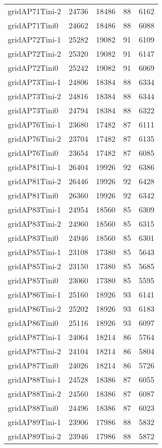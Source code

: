 \begin{longtable}{lrrrr}
gridAP71Tini-2 & 24736 & 18486 & 88 & 6162 \\
gridAP71Tini0 & 24662 & 18486 & 88 & 6088 \\
gridAP72Tini-1 & 25282 & 19082 & 91 & 6109 \\
gridAP72Tini-2 & 25320 & 19082 & 91 & 6147 \\
gridAP72Tini0 & 25242 & 19082 & 91 & 6069 \\
gridAP73Tini-1 & 24806 & 18384 & 88 & 6334 \\
gridAP73Tini-2 & 24816 & 18384 & 88 & 6344 \\
gridAP73Tini0 & 24794 & 18384 & 88 & 6322 \\
gridAP76Tini-1 & 23680 & 17482 & 87 & 6111 \\
gridAP76Tini-2 & 23704 & 17482 & 87 & 6135 \\
gridAP76Tini0 & 23654 & 17482 & 87 & 6085 \\
gridAP81Tini-1 & 26404 & 19926 & 92 & 6386 \\
gridAP81Tini-2 & 26446 & 19926 & 92 & 6428 \\
gridAP81Tini0 & 26360 & 19926 & 92 & 6342 \\
gridAP83Tini-1 & 24954 & 18560 & 85 & 6309 \\
gridAP83Tini-2 & 24960 & 18560 & 85 & 6315 \\
gridAP83Tini0 & 24946 & 18560 & 85 & 6301 \\
gridAP85Tini-1 & 23108 & 17380 & 85 & 5643 \\
gridAP85Tini-2 & 23150 & 17380 & 85 & 5685 \\
gridAP85Tini0 & 23060 & 17380 & 85 & 5595 \\
gridAP86Tini-1 & 25160 & 18926 & 93 & 6141 \\
gridAP86Tini-2 & 25202 & 18926 & 93 & 6183 \\
gridAP86Tini0 & 25116 & 18926 & 93 & 6097 \\
gridAP87Tini-1 & 24064 & 18214 & 86 & 5764 \\
gridAP87Tini-2 & 24104 & 18214 & 86 & 5804 \\
gridAP87Tini0 & 24026 & 18214 & 86 & 5726 \\
gridAP88Tini-1 & 24528 & 18386 & 87 & 6055 \\
gridAP88Tini-2 & 24560 & 18386 & 87 & 6087 \\
gridAP88Tini0 & 24496 & 18386 & 87 & 6023 \\
gridAP89Tini-1 & 23906 & 17986 & 88 & 5832 \\
gridAP89Tini-2 & 23946 & 17986 & 88 & 5872 \\

\end{longtable}
